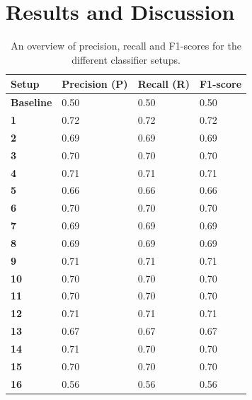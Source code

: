 \documentclass[
10pt, %
a4paper, %
oneside, %
headinclude,footinclude, %
] {book}%
\begin{document}
\chapter{Results and Discussion}
\begin{table}[]
\caption{An overview of precision, recall and F1-scores for the different classifier setups.}
\label{results-overview}
\begin{tabular}{@{}llll@{}}
\toprule
\textbf{Setup} & \textbf{Precision (P)} & \textbf{Recall (R)} & \textbf{F1-score} \\ \midrule
\textbf{Baseline} & 0.50                   & 0.50                & 0.50              \\
\textbf{1}        & 0.72                   & 0.72                & 0.72              \\
\textbf{2}        & 0.69                   & 0.69                & 0.69              \\
\textbf{3}        & 0.70                   & 0.70                & 0.70              \\
\textbf{4}        & 0.71                   & 0.71                & 0.71              \\
\textbf{5}        & 0.66                   & 0.66                & 0.66              \\
\textbf{6}        & 0.70                   & 0.70                & 0.70              \\
\textbf{7}        & 0.69                   & 0.69                & 0.69              \\
\textbf{8}        & 0.69                   & 0.69                & 0.69              \\

\textbf{9}         & 0.71                   & 0.71                & 0.71              \\
\textbf{10}       & 0.70                   & 0.70                & 0.70              \\
\textbf{11}       & 0.70                   & 0.70                & 0.70              \\
\textbf{12}       & 0.71                   & 0.71                & 0.71              \\
\textbf{13}       & 0.67                   & 0.67                & 0.67              \\
\textbf{14}       & 0.71                   & 0.70                & 0.70              \\
\textbf{15}       & 0.70                   & 0.70                & 0.70              \\
\textbf{16}       & 0.56                   & 0.56                & 0.56              \\


\end{tabular}
\end{table}
\end{document}
